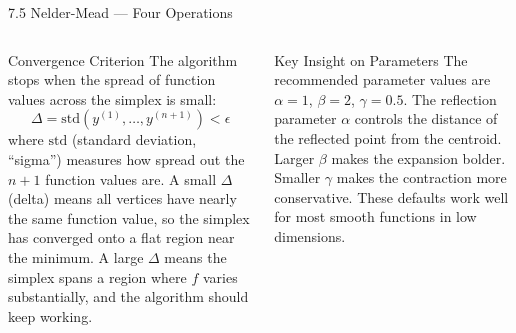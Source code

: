 \documentclass[aspectratio=169,10pt]{beamer}
\begin{document}
\begin{frame}[allowframebreaks]{7.5 Nelder-Mead --- Four Operations}
\begin{columns}[T]
      \begin{block}{Convergence Criterion}
        The algorithm stops when the spread of function values across
        the simplex is small:
        \[
          \Delta = \text{std}\!\left(y^{(1)},\ldots,y^{(n+1)}\right) < \epsilon
        \]
        where $\text{std}$ (standard deviation, ``sigma'') measures
        how spread out the $n+1$ function values are.  A small
        $\Delta$ (delta) means all vertices have nearly the same
        function value, so the simplex has converged onto a flat region
        near the minimum.  A large $\Delta$ means the simplex spans a
        region where $f$ varies substantially, and the algorithm should
        keep working.
      \end{block}

      \begin{alertblock}{Key Insight on Parameters}
        The recommended parameter values are $\alpha=1$, $\beta=2$,
        $\gamma=0.5$.  The reflection parameter $\alpha$ controls the
        distance of the reflected point from the centroid.  Larger
        $\beta$ makes the expansion bolder.  Smaller $\gamma$ makes
        the contraction more conservative.  These defaults work well
        for most smooth functions in low dimensions.
      \end{alertblock}
  \end{columns}
\end{frame}
\end{document}
